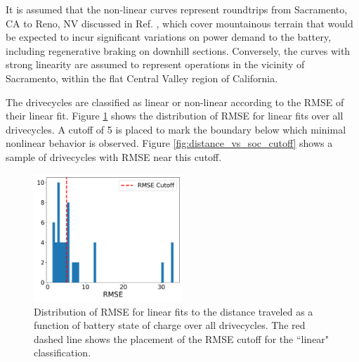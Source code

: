 It is assumed that the non-linear curves represent roundtrips from Sacramento, CA to Reno, NV discussed in Ref. \cite{NACFE_2023}, which cover mountainous terrain that would be expected to incur significant variations on power demand to the battery, including regenerative braking on downhill sections. Conversely, the curves with strong linearity are assumed to represent operations in the vicinity of Sacramento, within the flat Central Valley region of California. 

The drivecycles are classified as linear or non-linear according to the RMSE of their linear fit. Figure \ref{fig:rmse_dist} shows the distribution of RMSE for linear fits over all drivecycles. A cutoff of 5 is placed to mark the boundary below which minimal nonlinear behavior is observed. Figure \ref{fig:distance_vs_soc_cutoff} shows a sample of drivecycles with RMSE near this cutoff. 

\begin{figure}[ht]
        \centering
        \includegraphics[width=0.5\textwidth]{figures/all_RMSE.png}
        \caption{Distribution of RMSE for linear fits to the distance traveled as a function of battery state of charge over all drivecycles. The red dashed line shows the placement of the RMSE cutoff for the ``linear" classification.}
        \label{fig:rmse_dist}
\end{figure}

